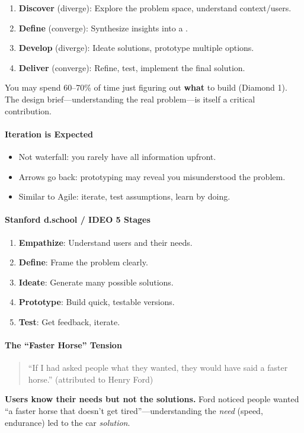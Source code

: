 \begin{enumerate}
  \item \textbf{Discover} (diverge): Explore the problem space, understand context/users.
  \item \textbf{Define} (converge): Synthesize insights into a .
  \item \textbf{Develop} (diverge): Ideate solutions, prototype multiple options.
  \item \textbf{Deliver} (converge): Refine, test, implement the final solution.
\end{enumerate}

\begin{tipbox}
You may spend 60--70\% of time just figuring out \textbf{what} to build (Diamond 1). The design brief---understanding the real problem---is itself a critical contribution.
\end{tipbox}

\paragraph*{Iteration is Expected}
\begin{itemize}
  \item Not waterfall: you rarely have all information upfront.
  \item Arrows go back: prototyping may reveal you misunderstood the problem.
  \item Similar to Agile: iterate, test assumptions, learn by doing.
\end{itemize}

\paragraph*{Stanford d.school / IDEO 5 Stages}
\begin{enumerate}
  \item \textbf{Empathize}: Understand users and their needs.
  \item \textbf{Define}: Frame the problem clearly.
  \item \textbf{Ideate}: Generate many possible solutions.
  \item \textbf{Prototype}: Build quick, testable versions.
  \item \textbf{Test}: Get feedback, iterate.
\end{enumerate}

\paragraph*{The ``Faster Horse'' Tension}
\begin{quote}
``If I had asked people what they wanted, they would have said a faster horse.'' (attributed to Henry Ford)
\end{quote}
\textbf{Users know their needs but not the solutions.} Ford noticed people wanted ``a faster horse that doesn't get tired''---understanding the \textit{need} (speed, endurance) led to the car \textit{solution}.

